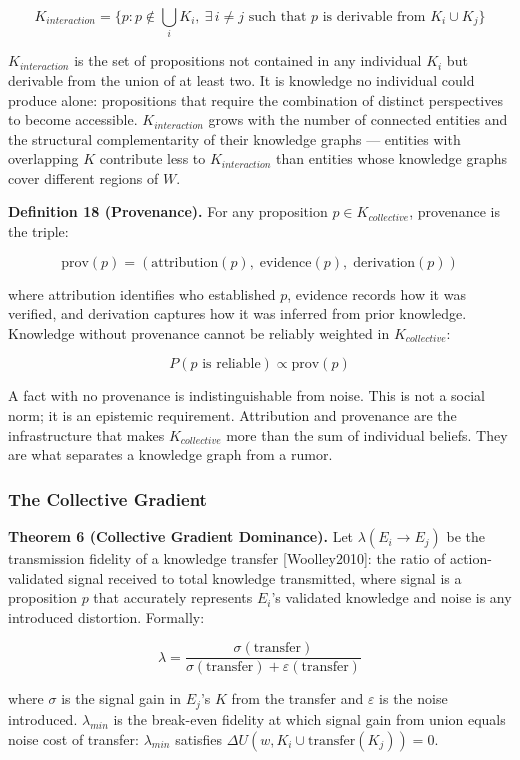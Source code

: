 \documentclass[
]{article}
\begin{document}
\[K_{interaction} = \{p : p \notin \bigcup_i K_i,\ \exists\, i \neq j \text{ such that } p \text{ is derivable from } K_i \cup K_j\}\]

\(K_{interaction}\) is the set of propositions not contained in any
individual \(K_i\) but derivable from the union of at least two. It is
knowledge no individual could produce alone: propositions that require
the combination of distinct perspectives to become accessible.
\(K_{interaction}\) grows with the number of connected entities and the
structural complementarity of their knowledge graphs --- entities with
overlapping \(K\) contribute less to \(K_{interaction}\) than entities
whose knowledge graphs cover different regions of \(W\).

\textbf{Definition 18 (Provenance).} For any proposition
\(p \in K_{collective}\), provenance is the triple:

\[\text{prov}(p) = (\text{attribution}(p),\; \text{evidence}(p),\; \text{derivation}(p))\]

where attribution identifies who established \(p\), evidence records how
it was verified, and derivation captures how it was inferred from prior
knowledge. Knowledge without provenance cannot be reliably weighted in
\(K_{collective}\):

\[P(p \text{ is reliable}) \propto \text{prov}(p)\]

A fact with no provenance is indistinguishable from noise. This is not a
social norm; it is an epistemic requirement. Attribution and provenance
are the infrastructure that makes \(K_{collective}\) more than the sum
of individual beliefs. They are what separates a knowledge graph from a
rumor.

\subsubsection{The Collective Gradient}\label{the-collective-gradient}

\textbf{Theorem 6 (Collective Gradient Dominance).} Let
\(\lambda(E_i \to E_j)\) be the transmission fidelity of a knowledge
transfer {[}Woolley2010{]}: the ratio of action-validated signal
received to total knowledge transmitted, where signal is a proposition
\(p\) that accurately represents \(E_i\)'s validated knowledge and noise
is any introduced distortion. Formally:

\[\lambda = \frac{\sigma(\text{transfer})}{\sigma(\text{transfer}) + \varepsilon(\text{transfer})}\]

where \(\sigma\) is the signal gain in \(E_j\)'s \(K\) from the transfer
and \(\varepsilon\) is the noise introduced. \(\lambda_{min}\) is the
break-even fidelity at which signal gain from union equals noise cost of
transfer: \(\lambda_{min}\) satisfies
\(\Delta U(w, K_i \cup \text{transfer}(K_j)) = 0\).
\end{document}

